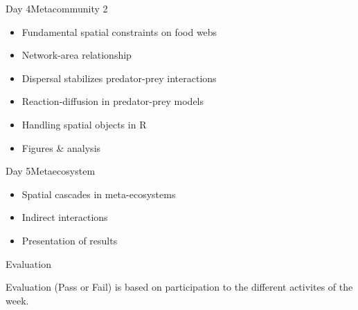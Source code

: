 \documentclass[10pt,aspectratio=149]{beamer}
\begin{document}

\begin{frame}{Day 4}{Metacommunity 2}

    \begin{itemize}
        \item Fundamental spatial constraints on food webs
        \item Network-area relationship
        \item Dispersal stabilizes predator-prey interactions
        \item Reaction-diffusion in predator-prey models 
        \item Handling spatial objects in R 
        \item Figures \& analysis
    \end{itemize}

\end{frame}


\begin{frame}{Day 5}{Metaecosystem}

    \begin{itemize}
        \item Spatial cascades in meta-ecosystems
        \item Indirect interactions
        \item Presentation of results        
    \end{itemize}

\end{frame}


\begin{frame}{Evaluation}

    Evaluation (Pass or Fail) is based on participation to the different activites of the week. 

\end{frame}

\end{document}

